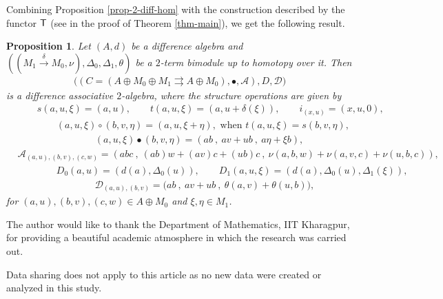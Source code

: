 \documentclass[a4paper,reqno,10pt]{amsart}
\theoremstyle{plain}
\newtheorem{prop}[thm]{Proposition}
\theoremstyle{definition}
\theoremstyle{remark}
\begin{document}
\medskip

Combining Proposition \ref{prop-2-diff-hom} with the construction described by the functor ${\sf T}$ (see in the proof of Theorem \ref{thm-main}), we get the following result.

\begin{prop}
    Let $(A, d)$ be a difference algebra and $((M_1 \xrightarrow{\delta} M_0, \nu), \Delta_0, \Delta_1, \theta)$ be a $2$-term bimodule up to homotopy over it. Then 
    \begin{align*}
        \big( ( C = (A \oplus M_0\oplus M_1 \rightrightarrows A \oplus M_0), \bullet, \mathcal{A}) , D, \mathcal{D} \big)
    \end{align*}
    is a difference associative $2$-algebra, where the structure operations are given by
\begin{align*}
&\qquad s (a, u, \xi) = (a, u), \qquad t (a, u, \xi) = (a, u + \delta (\xi)), \qquad i_{(x, u)} = (x, u, 0), \\
& \qquad \qquad (a, u, \xi) \circ (b, v, \eta) = (a, u, \xi + \eta), \text{ when } t (a, u, \xi) = s (b, v, \eta),\\
& \qquad \qquad \qquad \qquad (a, u, \xi) \bullet (b, v, \eta) = (ab ~ \! , ~ \! a v + u b ~ \! , ~ \!  a \eta + \xi b), \\
& \mathcal{A}_{(a, u), (b, v), (c, w)} = ( ab c ~ \! , ~ \! (ab) w + (a v) c + (u b) c ~ \! , ~ \! \nu (a, b, w) + \nu (a, v, c) + \nu (u, b, c)  ),\\
& \qquad \qquad D_0 (a, u) = (d(a), \Delta_0 (u)), \qquad D_1 (a, u, \xi) = (d(a), \Delta_0 (u), \Delta_1 (\xi)), \\
&  \qquad \qquad \qquad \qquad \mathcal{D}_{(a, u), (b, v)} = \big( ab ~ \! , ~ \! a v + ub ~ \! , ~ \!  \theta (a, v) + \theta (u, b) \big), 
\end{align*}
for $(a, u), (b, v), (c, w) \in A \oplus M_0$ and $\xi, \eta \in M_1$.
\end{prop}


\medskip
    
 The author would like to thank the Department of Mathematics, IIT Kharagpur, for providing a beautiful academic atmosphere in which the research was carried out.

\medskip

 Data sharing does not apply to this article as no new data were created or analyzed in this study.
\end{document}
